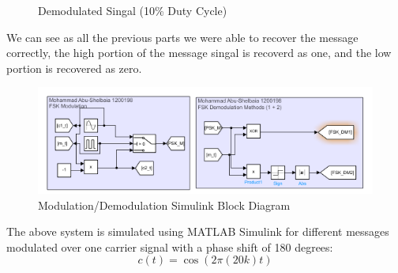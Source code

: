 \documentclass[12pt]{article}
\begin{document}
\begin{figure}[H]
    \centering
    \caption{Demodulated Singal (10\% Duty Cycle)}
\end{figure}
We can see as all the previous parts we were able to recover the message correctly, the high portion of the message singal is recoverd as one, and the low portion is recovered as zero.
\begin{figure}[H]
    \centering
    \includegraphics[width=1\textwidth]{assets//main/2023-08-27-16-46-40.png}
    \caption{Modulation/Demodulation Simulink Block Diagram}
\end{figure}
The above system is simulated using MATLAB Simulink for different messages modulated over one carrier signal with a phase shift of 180 degrees:
\begin{equation}
    c(t) = \cos(2\pi(20k)t)
\end{equation}
\end{document}

